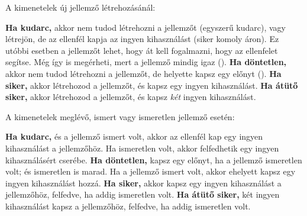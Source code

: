 A kimenetelek új jellemző létrehozásánál:

\begin{itemize}
    \failureitem \textbf{Ha kudarc,} akkor nem tudod létrehozni a jellemzőt (egyszerű kudarc), vagy létrejön, de az ellenfél kapja az ingyen kihasználást (siker komoly áron). Ez utóbbi esetben a jellemzőt lehet, hogy át kell fogalmazni, hogy az ellenfelet segítse. Még így is megérheti, mert a jellemző mindig igaz ().
    \tieitem \textbf{Ha döntetlen,} akkor nem tudod létrehozni a jellemzőt, de helyette kapsz egy előnyt ().
    \successitem \textbf{Ha siker,} akkor létrehozod a jellemzőt, és kapsz egy ingyen kihasználást.
    \successwithstyleitem \textbf{Ha átütő siker,} akkor létrehozod a jellemzőt, és kapsz \emph{két} ingyen kihasználást.
\end{itemize}

A kimenetelek meglévő, ismert vagy ismeretlen jellemző esetén:

\begin{itemize}
    \failureitem \textbf{Ha kudarc,} és a jellemző ismert volt, akkor az ellenfél kap egy ingyen kihasználást a jellemzőhöz. Ha ismeretlen volt, akkor felfedhetik egy ingyen kihasználásért cserébe.
    \tieitem \textbf{Ha döntetlen,} kapsz egy előnyt, ha a jellemző ismeretlen volt; és ismeretlen is marad. Ha a jellemző ismert volt, akkor ehelyett kapsz egy ingyen kihasználást hozzá.
    \successitem \textbf{Ha siker,} akkor kapsz egy ingyen kihasználást a jellemzőhöz, felfedve, ha addig ismeretlen volt.
    \successwithstyleitem \textbf{Ha átütő siker,} két ingyen kihasználást kapsz a jellemzőhöz, felfedve, ha addig ismeretlen volt.
\end{itemize}

\newpage


